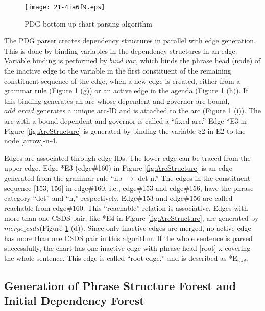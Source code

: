 \documentclass[english]{jnlp_1.4_rep}
\theoremstyle{break}
\theoremstyle{plain}
\theoremstyle{plain}
\begin{document}
\begin{figure}[t]
 \begin{center}
\texttt{[image: 21-4ia6f9.eps]}
 \end{center}
\caption{PDG bottom-up chart parsing algorithm}
\label{fig:ChartAlgotithm}
\vspace{-0.5\Cvs}
\end{figure}

The PDG parser creates dependency structures in parallel with edge
generation. This is done by binding variables in the dependency
structures in an edge. Variable binding is performed by $bind\_var$,
which binds the phrase head (node) of the inactive edge to the
variable in the first constituent of the remaining constituent
sequence of the edge, when a new edge is created, either from a
grammar rule (Figure \ref{fig:ChartAlgotithm} (g)) or an active edge in
the agenda (Figure \ref{fig:ChartAlgotithm} (h)). If this binding
generates an arc whose dependent and governor are bound, $add\_arcid$
generates a unique arc-ID and is attached to the arc
(Figure \ref{fig:ChartAlgotithm} (i)). The arc with a bound dependent and
governor is called a ``fixed arc.'' Edge *E3 in
Figure \ref{fig:ArcStructure} is generated by binding the variable \$2 in
E2 to the node [arrow]-n-4.

Edges are associated through edge-IDs. The lower edge can be traced
from the upper edge. Edge *E3 (edge\#160) in
Figure \ref{fig:ArcStructure} is an edge generated from the grammar rule
``np $\rightarrow$ det n.'' The edges in the constituent sequence
[153, 156] in edge\#160, i.e., edge\#153 and edge\#156, have the
phrase category ``det'' and ``n,'' respectively. Edge\#153 and
edge\#156 are called reachable from edge\#160. This ``reachable''
relation is associative. Edges with more than one CSDS pair, like *E4
in Figure \ref{fig:ArcStructure}, are generated by
$merge\_csds$(Figure \ref{fig:ChartAlgotithm} (d)). Since only inactive
edges are merged, no active edge has more than one CSDS pair in this
algorithm. If the whole sentence is parsed successfully, the chart has
one inactive edge with phrase head [root]-x covering the whole
sentence. This edge is called ``root edge,'' and is described as
*E$_{root}$.


\subsection{Generation of Phrase Structure Forest and Initial Dependency \mbox{Forest}}
\label{sec:PFandDFseisei}
\end{document}
